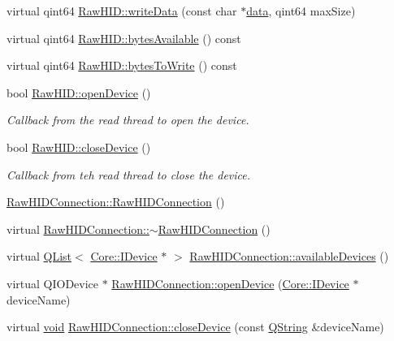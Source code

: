 \begin{DoxyCompactItemize}
\item 
virtual qint64 \hyperlink{group___raw_h_i_d_plugin_ga59184fec2a68eecf3e08e81303b8cdbe}{Raw\-H\-I\-D\-::write\-Data} (const char $\ast$\hyperlink{glext_8h_a8850df0785e6fbcc2351af3b686b8c7a}{data}, qint64 max\-Size)
\item 
virtual qint64 \hyperlink{group___raw_h_i_d_plugin_ga5bd4826624aa1689aedbfd1832c4ddb4}{Raw\-H\-I\-D\-::bytes\-Available} () const 
\item 
virtual qint64 \hyperlink{group___raw_h_i_d_plugin_gaf0246fd49e7dc9cda82b983312f4a782}{Raw\-H\-I\-D\-::bytes\-To\-Write} () const 
\item 
bool \hyperlink{group___raw_h_i_d_plugin_gafc323c516287e2e1e5e12b425cd28b4b}{Raw\-H\-I\-D\-::open\-Device} ()
\begin{DoxyCompactList}\small\item\em Callback from the read thread to open the device. \end{DoxyCompactList}\item 
bool \hyperlink{group___raw_h_i_d_plugin_ga6cf706b44d1aaf58b4218b3cacbc6218}{Raw\-H\-I\-D\-::close\-Device} ()
\begin{DoxyCompactList}\small\item\em Callback from teh read thread to close the device. \end{DoxyCompactList}\item 
\hyperlink{group___raw_h_i_d_plugin_gaa6d75047d32946b3823a1cfe7b4d7328}{Raw\-H\-I\-D\-Connection\-::\-Raw\-H\-I\-D\-Connection} ()
\item 
virtual \hyperlink{group___raw_h_i_d_plugin_ga5d3dcc8e69d09013ff84a3412f1ccee7}{Raw\-H\-I\-D\-Connection\-::$\sim$\-Raw\-H\-I\-D\-Connection} ()
\item 
virtual \hyperlink{class_q_list}{Q\-List}$<$ \hyperlink{class_core_1_1_i_device}{Core\-::\-I\-Device} $\ast$ $>$ \hyperlink{group___raw_h_i_d_plugin_ga9a33750f32a6e48ba7463beaacf3696d}{Raw\-H\-I\-D\-Connection\-::available\-Devices} ()
\item 
virtual Q\-I\-O\-Device $\ast$ \hyperlink{group___raw_h_i_d_plugin_ga861af14dd75658d985780004160aefa2}{Raw\-H\-I\-D\-Connection\-::open\-Device} (\hyperlink{class_core_1_1_i_device}{Core\-::\-I\-Device} $\ast$device\-Name)
\item 
virtual \hyperlink{group___u_a_v_objects_plugin_ga444cf2ff3f0ecbe028adce838d373f5c}{void} \hyperlink{group___raw_h_i_d_plugin_ga80b9d6de6f0e054368bb3d920aa36de4}{Raw\-H\-I\-D\-Connection\-::close\-Device} (const \hyperlink{group___u_a_v_objects_plugin_gab9d252f49c333c94a72f97ce3105a32d}{Q\-String} \&device\-Name)

\end{DoxyCompactItemize}
